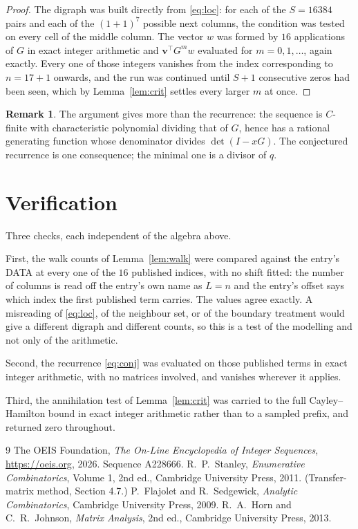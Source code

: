 \documentclass[11pt,a4paper]{article}
\theoremstyle{plain}
\theoremstyle{definition}
\newtheorem{remark}[theorem]{Remark}
\begin{document}
\begin{proof}
The digraph was built directly from \eqref{eq:loc}: for each of the $S=16384$ pairs and each
of the $(1+1)^{7}$ possible next columns, the condition was tested on every cell of
the middle column. The vector $w$ was formed by $16$ applications of $G$ in exact integer
arithmetic and $\mathbf{v}^{\!\top}G^{m}w$ evaluated for $m=0,1,\dots$, again exactly.
Every one of those integers vanishes from the index corresponding to $n=17+1$ onwards,
and the run was continued until $S+1$ consecutive zeros had been seen, which by
Lemma~\ref{lem:crit} settles every larger $m$ at once.
\end{proof}

\begin{remark}
The argument gives more than the recurrence: the sequence is $C$-finite with characteristic
polynomial dividing that of $G$, hence has a rational generating function whose denominator
divides $\det(I-xG)$. The conjectured recurrence is one consequence; the minimal one is a
divisor of $q$.
\end{remark}

\section{Verification}

Three checks, each independent of the algebra above.

First, the walk counts of Lemma~\ref{lem:walk} were compared against the entry's DATA at
every one of the $16$ published indices, with no shift fitted: the number of columns is
read off the entry's own name as $L=n$ and the entry's offset says which index the first
published term carries. The values agree exactly. A misreading of \eqref{eq:loc}, of the
neighbour set, or of the boundary treatment would give a different digraph and different
counts, so this is a test of the modelling and not only of the arithmetic.

Second, the recurrence \eqref{eq:conj} was evaluated on those published terms in exact
integer arithmetic, with no matrices involved, and vanishes wherever it applies.

Third, the annihilation test of Lemma~\ref{lem:crit} was carried to the full
Cayley--Hamilton bound in exact integer arithmetic rather than to a sampled prefix, and
returned zero throughout.

\begin{thebibliography}{9}
 The OEIS Foundation, \emph{The On-Line Encyclopedia of Integer
Sequences}, \url{https://oeis.org}, 2026. Sequence A228666.
 R.~P.~Stanley, \emph{Enumerative Combinatorics}, Volume 1, 2nd ed.,
Cambridge University Press, 2011. (Transfer-matrix method, Section 4.7.)
 P.~Flajolet and R.~Sedgewick, \emph{Analytic Combinatorics}, Cambridge
University Press, 2009.
 R.~A.~Horn and C.~R.~Johnson, \emph{Matrix Analysis}, 2nd ed., Cambridge
University Press, 2013.
\end{thebibliography}
\end{document}
